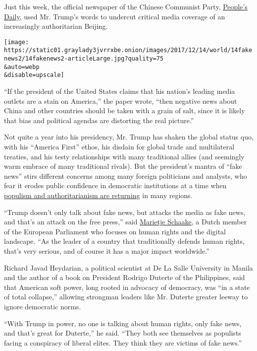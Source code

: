Just this week, the official newspaper of the Chinese Communist Party,
\href{http://en.people.cn/mobile/new/content.html?cI=1002\&nI=9302932\&aT=m}{People's
Daily}, used Mr. Trump's words to undercut critical media coverage of an
increasingly authoritarian Beijing.

\texttt{[image: https://static01.graylady3jvrrxbe.onion/images/2017/12/14/world/14fakenews2/14fakenews2-articleLarge.jpg?quality=75\\\&auto=webp\\\&disable=upscale]}

``If the president of the United States claims that his nation's leading
media outlets are a stain on America,'' the paper wrote, ``then negative
news about China and other countries should be taken with a grain of
salt, since it is likely that bias and political agendas are distorting
the real picture.''

Not quite a year into his presidency, Mr. Trump has shaken the global
status quo, with his ``America First'' ethos, his disdain for global
trade and multilateral treaties, and his testy relationships with many
traditional allies (and seemingly warm embrace of many traditional
rivals). But the president's mantra of ``fake news'' stirs different
concerns among many foreign politicians and analysts, who fear it erodes
public confidence in democratic institutions at a time when
\href{https://www.nytimes3xbfgragh.onion/2016/11/29/world/americas/western-liberal-democracy.html}{populism
and authoritarianism are returning} in many regions.

``Trump doesn't only talk about fake news, but attacks the media as fake
news, and that's an attack on the free press,'' said
\href{http://www.europarl.europa.eu/meps/en/96945/Marietje_SCHAAKE_home.html}{Marietje
Schaake}, a Dutch member of the European Parliament who focuses on human
rights and the digital landscape. ``As the leader of a country that
traditionally defends human rights, that's very serious, and of course
it has a major impact worldwide.''

Richard Javad Heydarian, a political scientist at De La Salle University
in Manila and the author of a book on President Rodrigo Duterte of the
Philippines, said that American soft power, long rooted in advocacy of
democracy, was ``in a state of total collapse,'' allowing strongman
leaders like Mr. Duterte greater leeway to ignore democratic norms.

``With Trump in power, no one is talking about human rights, only fake
news, and that's great for Duterte,'' he said. ``They both see
themselves as populists facing a conspiracy of liberal elites. They
think they are victims of fake news.''

